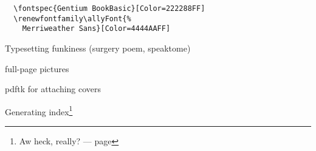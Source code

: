 \begin{paracol}{2}
\begin{leftcolumn}
\begin{description}
  \begin{verbatim}
  \fontspec{Gentium BookBasic}[Color=222288FF]
  \renewfontfamily\allyFont{%
    Merriweather Sans}[Color=4444AAFF]\end{verbatim}
\end{description}

\newpage

Typesetting funkiness (surgery poem, speaktome)

\newpage

full-page pictures

\newpage

pdftk for attaching covers

\newpage

Generating index\footnote{Aw heck, really? --- page \pageref{indexmunge}}

\newpage
\end{leftcolumn}
\end{paracol}
